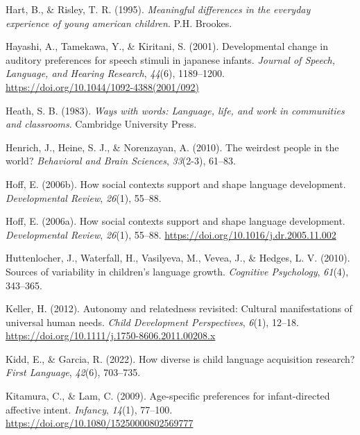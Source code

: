 \documentclass[
  ,man,floatsintext]{apa6}
\newlength{\cslhangindent}
\newlength{\cslentryspacingunit} %
\newenvironment{CSLReferences}[2] %
 {%
  \setlength{\parindent}{0pt}
  \ifodd #1
  \let\oldpar\par
  \def\par{\hangindent=\cslhangindent\oldpar}
  \fi
  \setlength{\parskip}{#2\cslentryspacingunit}
 }%
 {}
\begin{document}
\begin{CSLReferences}{1}{0}
\leavevmode{}%
Hart, B., \& Risley, T. R. (1995). \emph{Meaningful differences in the everyday experience of young american children}. P.H. Brookes.

\leavevmode{}%
Hayashi, A., Tamekawa, Y., \& Kiritani, S. (2001). Developmental change in auditory preferences for speech stimuli in japanese infants. \emph{Journal of Speech, Language, and Hearing Research}, \emph{44}(6), 1189--1200. \url{https://doi.org/10.1044/1092-4388(2001/092)}

\leavevmode{}%
Heath, S. B. (1983). \emph{Ways with words: Language, life, and work in communities and classrooms}. Cambridge University Press.

\leavevmode{}%
Henrich, J., Heine, S. J., \& Norenzayan, A. (2010). The weirdest people in the world? \emph{Behavioral and Brain Sciences}, \emph{33}(2-3), 61--83.

\leavevmode{}%
Hoff, E. (2006b). How social contexts support and shape language development. \emph{Developmental Review}, \emph{26}(1), 55--88.

\leavevmode{}%
Hoff, E. (2006a). How social contexts support and shape language development. \emph{Developmental Review}, \emph{26}(1), 55--88. \url{https://doi.org/10.1016/j.dr.2005.11.002}

\leavevmode{}%
Huttenlocher, J., Waterfall, H., Vasilyeva, M., Vevea, J., \& Hedges, L. V. (2010). Sources of variability in children's language growth. \emph{Cognitive Psychology}, \emph{61}(4), 343--365.

\leavevmode{}%
Keller, H. (2012). Autonomy and relatedness revisited: Cultural manifestations of universal human needs. \emph{Child Development Perspectives}, \emph{6}(1), 12--18. \url{https://doi.org/10.1111/j.1750-8606.2011.00208.x}

\leavevmode{}%
Kidd, E., \& Garcia, R. (2022). How diverse is child language acquisition research? \emph{First Language}, \emph{42}(6), 703--735.

\leavevmode{}%
Kitamura, C., \& Lam, C. (2009). Age-specific preferences for infant-directed affective intent. \emph{Infancy}, \emph{14}(1), 77--100. \url{https://doi.org/10.1080/15250000802569777}


\end{CSLReferences}
\end{document}

